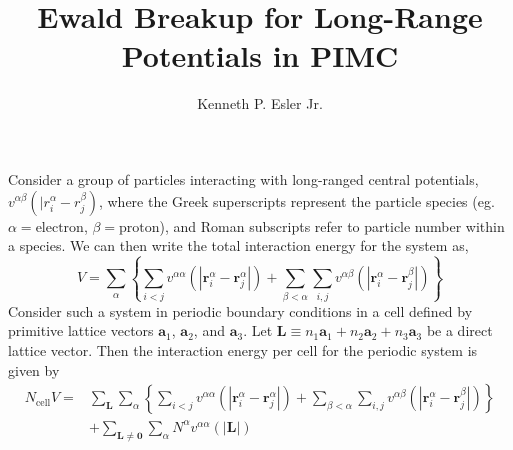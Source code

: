 \documentclass{article}
\title{Ewald Breakup for Long-Range Potentials in PIMC}
\author{Kenneth P. Esler Jr.}
\begin{document}
\maketitle
Consider a group of particles interacting with long-ranged central
potentials, $v^{\alpha \beta}(|r^{\alpha}_i - r^{\beta}_j)$, where the Greek superscripts
represent the particle species (eg. $\alpha=\text{electron}$,
$\beta=\text{proton}$), and Roman subscripts refer to particle number
within a species.  We can then write the total interaction energy for
the system as,
\newcommand{\vr}{\mathbf{r}}
\begin{equation}
V = \sum_\alpha \left\{\sum_{i<j} v^{\alpha\alpha}(|\vr^\alpha_i - \vr^\alpha_j|) +
\sum_{\beta<\alpha} 
\sum_{i,j} v^{\alpha \beta}(|\vr^{\alpha}_i - \vr^{\beta}_j|) \right\}
\end{equation}
\newcommand{\va}{\mathbf{a}}
\newcommand{\vb}{\mathbf{b}}
\newcommand{\vL}{\mathbf{L}}
Consider such a system in periodic boundary conditions in a cell
defined by primitive lattice vectors $\va_1$, $\va_2$, and $\va_3$.
Let $\vL \equiv n_1 \va_1 + n_2 \va_2 + n_3\va_3$ be a direct lattice
vector.  Then the interaction energy per cell for the periodic system
is given by
\begin{equation}
\begin{split}
N_\text{cell} V = & \sum_\vL \sum_\alpha \left\{ 
 \sum_{i<j} v^{\alpha\alpha}(|\vr^\alpha_i - \vr^\alpha_j|) +
\sum_{\beta<\alpha} 
\sum_{i,j} v^{\alpha \beta}(|\vr^{\alpha}_i - \vr^{\beta}_j|)
\right\}  \\
& + \sum_{\vL \neq \mathbf{0}} \sum_\alpha N^\alpha v^{\alpha \alpha} (|\vL|)
\end{split}
\end{equation}
\end{document}
